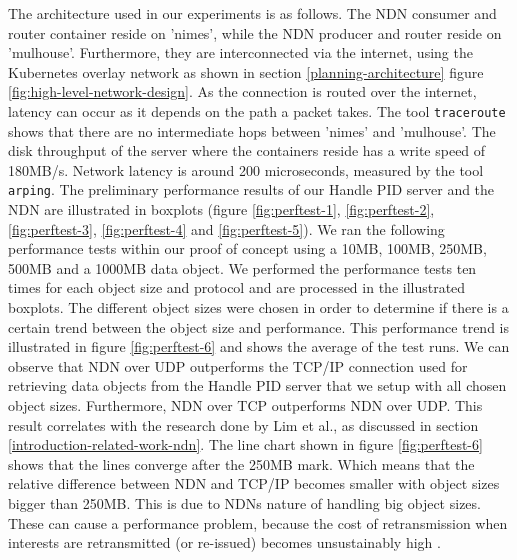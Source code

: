The architecture used in our experiments is as follows. The NDN consumer and router container reside on 'nimes', while the NDN producer and router reside on 'mulhouse'. Furthermore, they are interconnected via the internet, using the Kubernetes overlay network as shown in section \ref{planning-architecture} figure \ref{fig:high-level-network-design}. As the connection is routed over the internet, latency can occur as it depends on the path a packet takes. The tool \texttt{traceroute} shows that there are no intermediate hops between 'nimes' and 'mulhouse'. The disk throughput of the server where the containers reside has a write speed of 180MB/s. Network latency is around 200 microseconds, measured by the tool \texttt{arping}.
The preliminary performance results of our Handle PID server and the NDN are illustrated in boxplots (figure \ref{fig:perftest-1}, \ref{fig:perftest-2}, \ref{fig:perftest-3}, \ref{fig:perftest-4} and \ref{fig:perftest-5}). We ran the following performance tests within our proof of concept using a 10MB, 100MB, 250MB, 500MB and a 1000MB data object. We performed the performance tests ten times for each object size and protocol and are processed in the illustrated boxplots. The different object sizes were chosen in order to determine if there is a certain trend between the object size and performance. This performance trend is illustrated in figure \ref{fig:perftest-6} and shows the average of the test runs. We can observe that NDN over UDP outperforms the TCP/IP connection used for retrieving data objects from the Handle PID server that we setup with all chosen object sizes. Furthermore, NDN over TCP outperforms NDN over UDP. This result correlates with the research done by Lim et al., as discussed in section \ref{introduction-related-work-ndn}. The line chart shown in figure \ref{fig:perftest-6} shows that the lines converge after the 250MB mark. Which means that the relative difference between NDN and TCP/IP becomes smaller with object sizes bigger than 250MB. This is due to NDNs nature of handling big object sizes. These can cause a performance problem, because the cost of retransmission when interests are retransmitted (or re-issued) becomes unsustainably high \cite{ndn-objects}. %

